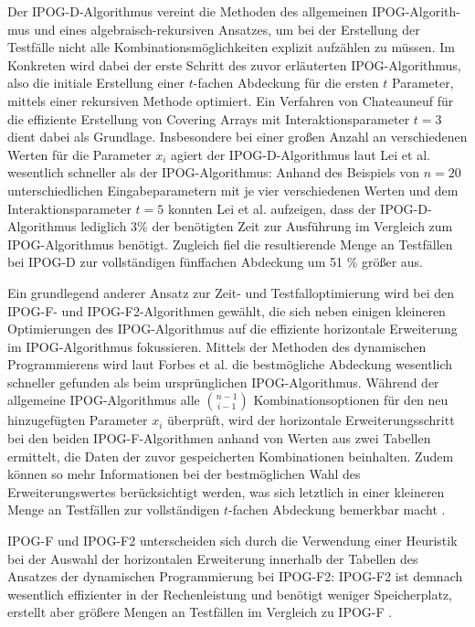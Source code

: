 Der IPOG-D-Algorithmus \cite{lei2008ipog} vereint die Methoden des allgemeinen IPOG-Algorith- mus und eines algebraisch-rekursiven Ansatzes, um bei der Erstellung der Testfälle nicht alle Kombinationsmöglichkeiten explizit aufzählen zu müssen. Im Konkreten wird dabei der erste Schritt des zuvor erläuterten IPOG-Algorithmus, also die initiale Erstellung einer $t$-fachen Abdeckung für die ersten $t$ Parameter, mittels einer rekursiven Methode optimiert. Ein Verfahren von Chateauneuf \cite{chateauneuf1999covering} für die effiziente Erstellung von Covering Arrays mit Interaktionsparameter $t = 3$ dient dabei als Grundlage. Insbesondere bei einer großen Anzahl an verschiedenen Werten für die Parameter $x_i$ agiert der IPOG-D-Algorithmus laut Lei et al. \cite{lei2008ipog} wesentlich schneller als der IPOG-Algorithmus: Anhand des Beispiels von $n=20$ unterschiedlichen Eingabeparametern mit je vier verschiedenen Werten und dem Interaktionsparameter $t=5$ konnten Lei et al. aufzeigen, dass der IPOG-D-Algorithmus lediglich 3\% der benötigten Zeit zur Ausführung im Vergleich zum IPOG-Algorithmus benötigt. Zugleich fiel die resultierende Menge an Testfällen bei IPOG-D zur vollständigen fünffachen Abdeckung um 51 \% größer aus.

Ein grundlegend anderer Ansatz zur Zeit- und Testfalloptimierung wird bei den IPOG-F- und IPOG-F2-Algorithmen \cite{forbes2008refining} gewählt, die sich neben einigen kleineren Optimierungen des IPOG-Algorithmus auf die effiziente horizontale Erweiterung im IPOG-Algorithmus fokussieren. Mittels der Methoden des dynamischen Programmierens wird laut Forbes et al. \cite{forbes2008refining} die bestmögliche Abdeckung wesentlich schneller gefunden als beim ursprünglichen IPOG-Algorithmus. Während der allgemeine IPOG-Algorithmus alle $\binom{n-1}{i-1}$ Kombinationsoptionen für den neu hinzugefügten Parameter $x_i$ überprüft, wird der horizontale Erweiterungsschritt bei den beiden IPOG-F-Algorithmen anhand von Werten aus zwei Tabellen ermittelt, die Daten der zuvor gespeicherten Kombinationen beinhalten. Zudem können so mehr Informationen bei der bestmöglichen Wahl des \glqq Erweiterungswertes\grqq{} berücksichtigt werden, was sich letztlich in einer kleineren Menge an Testfällen zur vollständigen $t$-fachen Abdeckung bemerkbar macht \cite{forbes2008refining}.

IPOG-F und IPOG-F2 unterscheiden sich durch die Verwendung einer Heuristik bei der Auswahl der horizontalen Erweiterung innerhalb der Tabellen des Ansatzes der dynamischen Programmierung bei IPOG-F2: IPOG-F2 ist demnach wesentlich effizienter in der Rechenleistung und benötigt weniger Speicherplatz, erstellt aber größere Mengen an Testfällen im Vergleich zu IPOG-F \cite{forbes2008refining}. 

